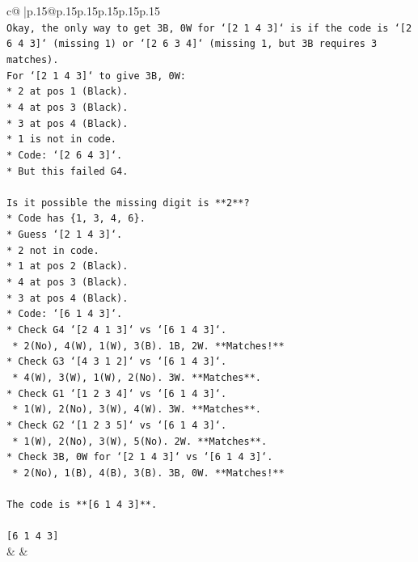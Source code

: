\documentclass{article}
\begin{document}
{\begin{supertabular}{c@{$\;$}|p{.15\linewidth}@{}p{.15\linewidth}p{.15\linewidth}p{.15\linewidth}p{.15\linewidth}p{.15\linewidth}}
{{{\\ 
\texttt{Okay, the only way to get 3B, 0W for `{[}2 1 4 3{]}` is if the code is `{[}2 6 4 3{]}` (missing 1) or `{[}2 6 3 4{]}` (missing 1, but 3B requires 3 matches).} \\
\texttt{For `{[}2 1 4 3{]}` to give 3B, 0W:} \\
\texttt{*   2 at pos 1 (Black).} \\
\texttt{*   4 at pos 3 (Black).} \\
\texttt{*   3 at pos 4 (Black).} \\
\texttt{*   1 is not in code.} \\
\texttt{*   Code: `{[}2 6 4 3{]}`.} \\
\texttt{*   But this failed G4.} \\
\\ 
\texttt{Is it possible the missing digit is **2**?} \\
\texttt{*   Code has \{1, 3, 4, 6\}.} \\
\texttt{*   Guess `{[}2 1 4 3{]}`.} \\
\texttt{*   2 not in code.} \\
\texttt{*   1 at pos 2 (Black).} \\
\texttt{*   4 at pos 3 (Black).} \\
\texttt{*   3 at pos 4 (Black).} \\
\texttt{*   Code: `{[}6 1 4 3{]}`.} \\
\texttt{*   Check G4 `{[}2 4 1 3{]}` vs `{[}6 1 4 3{]}`.} \\
\texttt{    *   2(No), 4(W), 1(W), 3(B). 1B, 2W. **Matches!**} \\
\texttt{*   Check G3 `{[}4 3 1 2{]}` vs `{[}6 1 4 3{]}`.} \\
\texttt{    *   4(W), 3(W), 1(W), 2(No). 3W. **Matches**.} \\
\texttt{*   Check G1 `{[}1 2 3 4{]}` vs `{[}6 1 4 3{]}`.} \\
\texttt{    *   1(W), 2(No), 3(W), 4(W). 3W. **Matches**.} \\
\texttt{*   Check G2 `{[}1 2 3 5{]}` vs `{[}6 1 4 3{]}`.} \\
\texttt{    *   1(W), 2(No), 3(W), 5(No). 2W. **Matches**.} \\
\texttt{*   Check 3B, 0W for `{[}2 1 4 3{]}` vs `{[}6 1 4 3{]}`.} \\
\texttt{    *   2(No), 1(B), 4(B), 3(B). 3B, 0W. **Matches!**} \\
\\ 
\texttt{The code is **{[}6 1 4 3{]}**.} \\
\\ 
\texttt{{[}6 1 4 3{]}} \\
            }
        }
    }
    & & \\ \\


\end{supertabular}}
\end{document}
